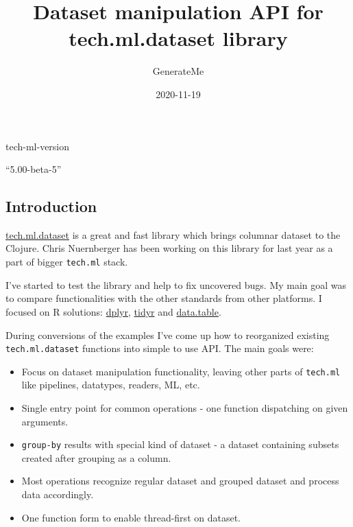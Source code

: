 \documentclass[]{article}
\title{Dataset manipulation API for tech.ml.dataset library}
\author{GenerateMe}
\date{2020-11-19}
\newenvironment{Shaded}{\begin{snugshade}}{\end{snugshade}}
\newcommand{\NormalTok}[1]{#1}
\providecommand{\tightlist}{%
  \setlength{\itemsep}{0pt}\setlength{\parskip}{0pt}}
\begin{document}
\maketitle

\begin{Shaded}
\begin{Highlighting}[]
\NormalTok{tech-ml-version}
\end{Highlighting}
\end{Shaded}

``5.00-beta-5''

\hypertarget{introduction}{%
\subsection{Introduction}\label{introduction}}

\href{https://github.com/techascent/tech.ml.dataset}{tech.ml.dataset} is
a great and fast library which brings columnar dataset to the Clojure.
Chris Nuernberger has been working on this library for last year as a
part of bigger \texttt{tech.ml} stack.

I've started to test the library and help to fix uncovered bugs. My main
goal was to compare functionalities with the other standards from other
platforms. I focused on R solutions:
\href{https://dplyr.tidyverse.org/}{dplyr},
\href{https://tidyr.tidyverse.org/}{tidyr} and
\href{https://rdatatable.gitlab.io/data.table/}{data.table}.

During conversions of the examples I've come up how to reorganized
existing \texttt{tech.ml.dataset} functions into simple to use API. The
main goals were:

\begin{itemize}
\tightlist
\item
  Focus on dataset manipulation functionality, leaving other parts of
  \texttt{tech.ml} like pipelines, datatypes, readers, ML, etc.
\item
  Single entry point for common operations - one function dispatching on
  given arguments.
\item
  \texttt{group-by} results with special kind of dataset - a dataset
  containing subsets created after grouping as a column.
\item
  Most operations recognize regular dataset and grouped dataset and
  process data accordingly.
\item
  One function form to enable thread-first on dataset.
\end{itemize}
\end{document}
